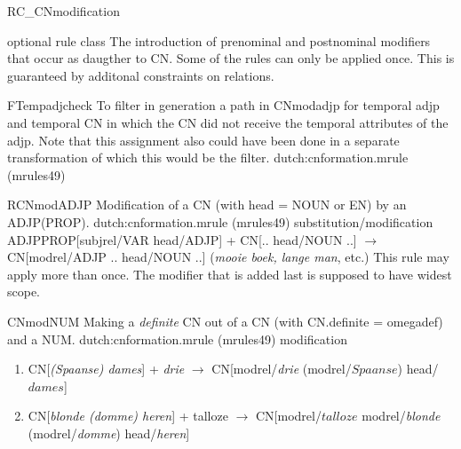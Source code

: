 \begin{mruleclass}{RC\_CNmodification}
\begin{classdescr}
\kind optional rule class
\classtask The introduction of prenominal 
and postnominal modifiers that occur as daugther to CN.
\classremarks
Some of the rules can only be applied once. This is guaranteed by additonal 
constraints on relations.
\begin{filters}

\begin{members}
\begin{member}
 FTempadjcheck
 To filter in generation a path in CNmodadjp for temporal adjp 
and temporal CN in which the CN did not receive the temporal attributes of the 
adjp. Note that this assignment also could have been done in a separate 
transformation of which this would be the filter.
\file dutch:cnformation.mrule (mrules49)
\end{member}
\end{members}
\end{filters}

\nospeedrules
\noplannedrules
\norulesnotince
\begin{comments}
\end{comments}

\end{classdescr}

\begin{members}

\begin{member}
 RCNmodADJP
 Modification of a CN (with head = NOUN or EN)  by an ADJP(PROP).
\file dutch:cnformation.mrule (mrules49)
\semantics substitution/modification
\example ADJPPROP[subjrel/VAR head/ADJP] + CN[.. head/NOUN ..]
$\rightarrow$ CN[modrel/ADJP .. head/NOUN ..] 
({\em mooie boek, lange man}, etc.)
\remarks This rule may apply more than once. The modifier that is 
added last is supposed to have widest scope.
\end{member}
\begin{member}
 CNmodNUM
 Making a {\em definite} CN out of a CN (with CN.definite =
omegadef) and a NUM.
\file dutch:cnformation.mrule (mrules49)
\semantics modification
\example\mbox{}

\begin{enumerate}
  \item 
CN[{\em (Spaanse) dames}] + {\em drie} $\rightarrow$ CN[modrel/{\em drie} 
(modrel/$Spaanse $) head/$dames$]
  \item
CN[{\em blonde (domme) heren}] + talloze $\rightarrow$ CN[modrel/$talloze$ 
modrel/{\em blonde} (modrel/{\em domme}) head/{\em heren}]


\end{enumerate}
\end{member}
\end{members}
\end{mruleclass}
